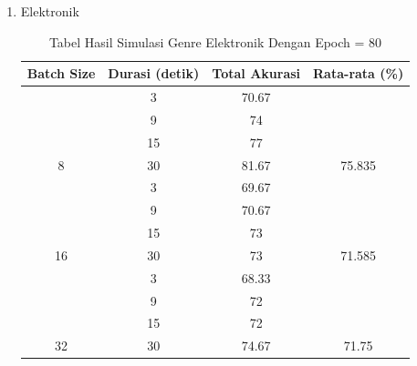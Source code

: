 \begin{enumerate}
	\item Elektronik
		\begin{longtable}[c]{|c|c|c|c|}
			\caption{Tabel Hasil Simulasi Genre Elektronik Dengan Epoch = 80}
			\label{tab:my-table}\\
			\hline
			\textbf{Batch Size}  & \textbf{Durasi (detik)} & \textbf{Total Akurasi} & \textbf{Rata-rata (\%)}                              \\ \hline
			\endfirsthead
			\endhead
			& 3                       & 70.67                  & {\color[HTML]{000000} }                         \\ \cline{2-3}
			& 9                       & 74                     & {\color[HTML]{000000} }                         \\ \cline{2-3}
			& 15                      & 77                     & {\color[HTML]{000000} }                         \\ \cline{2-3}
			\multirow{-4}{*}{8}  & 30                      & 81.67                  & \multirow{-4}{*}{{\color[HTML]{000000} 75.835}} \\ \hline
			& 3                       & 69.67                  & {\color[HTML]{000000} }                         \\ \cline{2-3}
			& 9                       & 70.67                  & {\color[HTML]{000000} }                         \\ \cline{2-3}
			& 15                      & 73                     & {\color[HTML]{000000} }                         \\ \cline{2-3}
			\multirow{-4}{*}{16} & 30                      & 73                     & \multirow{-4}{*}{{\color[HTML]{000000} 71.585}} \\ \hline
			& 3                       & 68.33                  & {\color[HTML]{000000} }                         \\ \cline{2-3}
			& 9                       & 72                     & {\color[HTML]{000000} }                         \\ \cline{2-3}
			& 15                      & 72                     & {\color[HTML]{000000} }                         \\ \cline{2-3}
			\multirow{-4}{*}{32} & 30                      & 74.67                  & \multirow{-4}{*}{{\color[HTML]{000000} 71.75}}  \\ \hline
		\end{longtable}
		

\end{enumerate}
